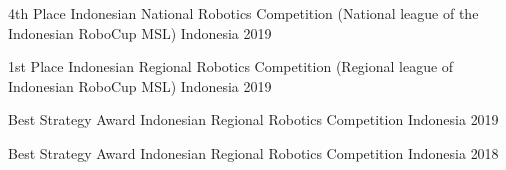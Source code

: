 \begin{cvhonors}

  \cvhonor
    {4th Place} %
    {Indonesian National Robotics Competition (National league of the Indonesian RoboCup MSL)} %
    {Indonesia} %
    {2019} %

  \cvhonor
    {1st Place} %
    {Indonesian Regional Robotics Competition (Regional league of Indonesian RoboCup MSL)} %
    {Indonesia} %
    {2019} %

  \cvhonor
    {Best Strategy Award} %
    {Indonesian Regional Robotics Competition} %
    {Indonesia} %
    {2019} %

  \cvhonor
    {Best Strategy Award} %
    {Indonesian Regional Robotics Competition} %
    {Indonesia} %
    {2018} %
\end{cvhonors}
